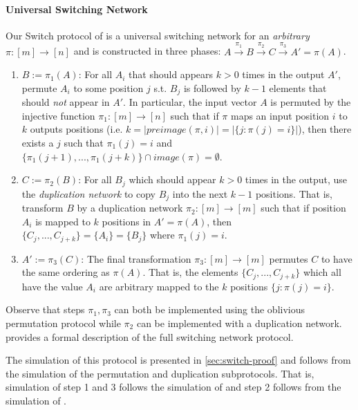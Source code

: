 \paragraph{Universal Switching Network}\label{sec:switch}

Our Switch protocol of  is a universal switching network for an \emph{arbitrary}  $\pi : [m]\rightarrow [n]$ and is constructed in three phases\cite{MS13}: %
 $A\overset{\pi_1}{\rightarrow}B\overset{\pi_2}{\rightarrow}C\overset{\pi_3}{\rightarrow}A'=\pi(A)$.
\begin{enumerate}
	\item $B:=\pi_1(A)$: For all $A_i$ that should appears $k>0$ times in the output $A'$, permute $A_i$ to some position $j$ s.t. $B_j$ is followed by $k-1$ elements that should \emph{not} appear in $A'$. In particular, the input vector $A$ is permuted by the injective function $\pi_1:[m]\rightarrow[n]$ such that if $\pi$ maps an input position $i$ to $k$ outputs positions (i.e. $k=|preimage(\pi,i)|=|\{ j : \pi(j)=i \}|$), then there exists a $j$ such that $\pi_1(j)=i$  and $\{\pi_1(j+ 1),...,\pi_1(j +k)\} \cap image(\pi) = \emptyset$. 
	
	\item $C:=\pi_2(B)$: For all $B_j$ which should appear $k>0$ times in the output, use the \emph{duplication network} to copy $B_j$ into the next $k-1$ positions. That is, transform $B$ by a duplication network  $\pi_2:[m]\rightarrow[m]$ such that if position $A_i$ is mapped to $k$ positions in $A'=\pi(A)$, then $\{ C_{j},...,C_{j+k}\} = \{A_i\}=\{B_j\}$ where $\pi_1(j)=i$. 
	
	\item $A':=\pi_3(C)$: The final transformation $\pi_3:[m]\rightarrow[m]$  permutes $C$ to have the same ordering as $\pi(A)$. That is, the elements $\{ C_{j},...,C_{j+k}\}$ which all have the value  $A_i$ are arbitrary mapped to the $k$ positions $\{ j : \pi(j)=i \}$.
\end{enumerate}
Observe that steps $\pi_1,\pi_3$ can both be implemented using the oblivious permutation protocol while $\pi_2$ can be implemented with a duplication network.
 provides a formal description of the full switching network protocol.

The simulation of this protocol is presented in \ref{sec:switch-proof} and follows from the simulation of the permutation and duplication subprotocols. That is, simulation of step 1 and 3 follows the simulation of  and step 2 follows from the simulation of .

